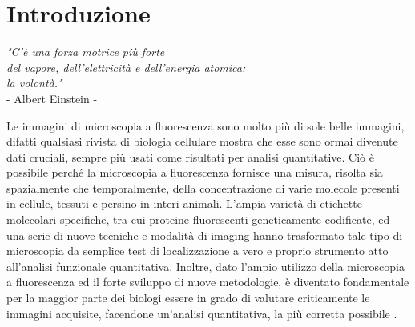 \clearpage{\pagestyle{empty}\cleardoublepage}
\chapter*{Introduzione} 
\begin{flushright}\begin{small}\textit{"C'è una forza motrice più forte\\ del vapore, dell'elettricità e dell'energia atomica:\\ la volontà."}\\
- Albert Einstein -\\
\end{small}\end{flushright}

Le immagini di microscopia a fluorescenza sono molto più di sole belle immagini, difatti qualsiasi rivista di biologia cellulare mostra che esse sono ormai divenute dati cruciali, sempre più usati come risultati per analisi quantitative.
Ciò è possibile perché la microscopia a fluorescenza fornisce una misura, risolta sia spazialmente che temporalmente, della concentrazione di varie molecole presenti in cellule, tessuti e persino in interi animali. 
L'ampia varietà di etichette molecolari specifiche, tra cui proteine fluorescenti geneticamente codificate, ed una serie di nuove tecniche e modalità di imaging  hanno trasformato tale tipo di microscopia da semplice test di localizzazione a vero e proprio strumento atto all'analisi funzionale quantitativa. Inoltre, dato l'ampio utilizzo della microscopia a fluorescenza ed il forte sviluppo di nuove metodologie, è diventato fondamentale per la maggior parte dei biologi essere in grado di valutare criticamente le immagini acquisite, facendone un'analisi quantitativa, la più corretta possibile \cite{fluo}.